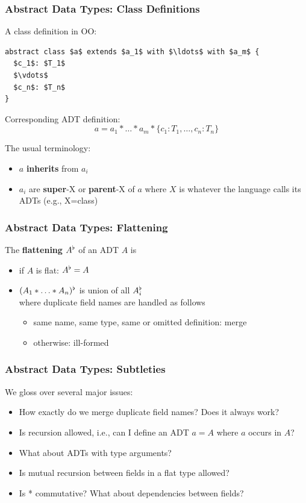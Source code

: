 \begin{frame}[fragile]\frametitle{Abstract Data Types: Class Definitions}
A class definition in OO:

\begin{lstlisting}
abstract class $a$ extends $a_1$ with $\ldots$ with $a_m$ {
  $c_1$: $T_1$
  $\vdots$
  $c_n$: $T_n$
}
\end{lstlisting}

Corresponding ADT definition:
\[a = a_1*\ldots*a_m*\{c_1:T_1,\ldots,c_n:T_n\}\]
\medskip

The usual terminology:
\begin{itemize}
\item $a$ \textbf{inherits} from $a_i$
\item $a_i$ are \textbf{super}-X or \textbf{parent}-X of $a$ where $X$ is whatever the language calls its ADTs (e.g., X=class)
\end{itemize}
\end{frame}

\begin{frame}\frametitle{Abstract Data Types: Flattening}
The \textbf{flattening} $A^\flat$ of an ADT $A$ is
\begin{itemize}
 \item if $A$ is flat: $A^\flat=A$
 \item $(A_1*\ldots*A_n)^\flat$ is union of all $A_i^\flat$\\
  where duplicate field names are handled as follows
  \begin{itemize}
   \item same name, same type, same or omitted definition: merge
   \item otherwise: ill-formed
  \end{itemize}
\end{itemize}
\end{frame}

\begin{frame}\frametitle{Abstract Data Types: Subtleties}
We gloss over several major issues:
\begin{itemize}
\item How exactly do we merge duplicate field names? Does it always work?
\item Is recursion allowed, i.e., can I define an ADT $a=A$ where $a$ occurs in $A$?
\item What about ADTs with type arguments?
\item Is mutual recursion between fields in a flat type allowed?
\item Is * commutative? What about dependencies between fields?
\end{itemize}
\end{frame}

